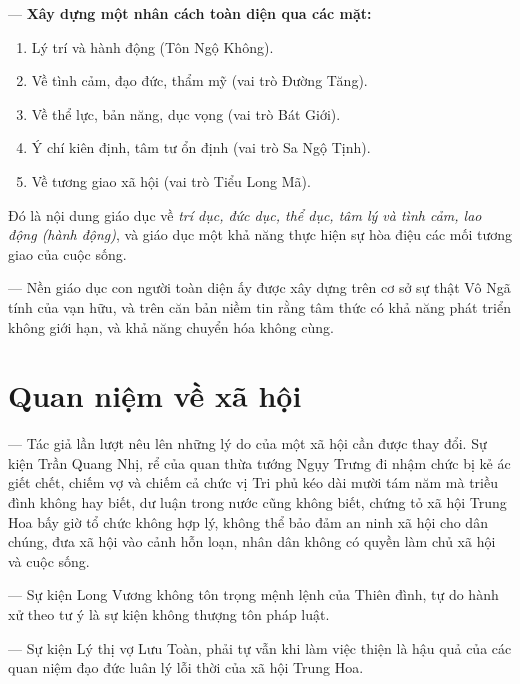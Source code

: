 — {\bf Xây dựng một nhân cách toàn diện qua các mặt:}

\begin{enumerate}[label=\itshape\arabic*\upshape/]

    \item Lý trí và hành động (Tôn Ngộ Không).

    \item Về tình cảm, đạo đức, thẩm mỹ (vai trò Đường Tăng).

    \item Về thể lực, bản năng, dục vọng (vai trò Bát Giới).

    \item Ý chí kiên định, tâm tư ổn định (vai trò Sa Ngộ Tịnh).

    \item Về tương giao xã hội (vai trò Tiểu Long Mã).
\end{enumerate}

Đó là nội dung giáo dục về \emph{trí dục, đức dục, thể dục, tâm lý và tình cảm, lao động (hành động)}, và giáo dục một khả năng thực hiện sự hòa điệu các mối tương giao của cuộc sống.

— Nền giáo dục con người toàn diện ấy được xây dựng trên cơ sở sự thật Vô Ngã tính của vạn hữu, và trên căn bản niềm tin rằng tâm thức có khả năng phát triển không giới hạn, và khả năng chuyển hóa không cùng.


\section{Quan niệm về xã hội} %
\label{sec:9_xa_hoi}

— Tác giả lần lượt nêu lên những lý do của một xã hội cần được thay đổi. Sự kiện Trần Quang Nhị, rể của quan thừa tướng Ngụy Trưng đi nhậm chức bị kẻ ác giết chết, chiếm vợ và chiếm cả chức vị Tri phủ kéo dài mười tám năm mà triều đình không hay biết, dư luận trong nước cũng không biết, chứng tỏ xã hội Trung Hoa bấy giờ tổ chức không hợp lý, không thể bảo đảm an ninh xã hội cho dân chúng, đưa xã hội vào cảnh hỗn loạn, nhân dân không có quyền làm chủ xã hội và cuộc sống.

— Sự kiện Long Vương không tôn trọng mệnh lệnh của Thiên đình, tự do hành xử theo tư ý là sự kiện không thượng tôn pháp luật.

— Sự kiện Lý thị vợ Lưu Toàn, phải tự vẫn khi làm việc thiện là hậu quả của các quan niệm đạo đức luân lý lỗi thời của xã hội Trung Hoa.

